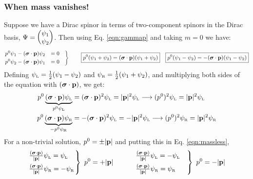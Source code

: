 \subsubsection{When mass vanishes!}
Suppose we have a Dirac spinor in terms of two-component spinors in the Dirac basis, $\Psi = \mqty(\psi_1\\ \psi_2)$. Then using Eq. \ref{eqn:gammap} and taking $m=0$ we have:
\begin{align}\label{eqn:massless}
    \begin{rcases}p^0 \psi_1 - (\boldsymbol{\sigma}\cdot \vb{p})\psi_2 &= 0\quad\\
    p^0 \psi_2 -(\boldsymbol{\sigma}\cdot \vb{p})\psi_1 &= 0\quad \end{rcases}\qquad 
    \boxed{p^0(\psi_1 + \psi_2) = (\boldsymbol{\sigma}\cdot \vb{p})(\psi_1+\psi_2)}\quad
    \boxed{p^0(\psi_1 - \psi_2) = -(\boldsymbol{\sigma}\cdot \vb{p})(\psi_1-\psi_2)}
\end{align}
Defining $\psi_{\text{\tiny L}} = \frac{1}{2}(\psi_1-\psi_2)$ and $\psi_{\text{\tiny R}} =\frac{1}{2} (\psi_1+\psi_2)$, and multiplying both sides of the equation with $(\boldsymbol{\sigma}\cdot \vb{p})$, we get:
\begin{align*}
 p^0\underbrace{(\boldsymbol{\sigma}\cdot \vb{p})\psi_{\text{\tiny L}}}_{p^0 \psi_{\text{\tiny L}}}&= (\boldsymbol{\sigma}\cdot \vb{p})^2\psi_{\text{\tiny L}} = |\vb{p}|^2 \psi_{\text{\tiny L}}\longrightarrow (p^0)^2 \psi_{\text{\tiny L}} = |\vb{p}|^2 \psi_{\text{\tiny L}}\\
 p^0\underbrace{(\boldsymbol{\sigma}\cdot \vb{p})\psi_{\text{\tiny R}}}_{-p^0 \psi_{\text{\tiny R}}} &=- (\boldsymbol{\sigma}\cdot \vb{p})^2\psi_{\text{\tiny L}} = -|\vb{p}|^2 \psi_{\text{\tiny L}}\longrightarrow (p^0)^2 \psi_{\text{\tiny R}} = |\vb{p}|^2 \psi_{\text{\tiny R}}
\end{align*}
For a non-trivial solution, $p^0 = \pm |\vb{p}|$ and putting this in Eq. \ref{eqn:massless}, 
\begin{align}
    \begin{rcases}
    \frac{(\boldsymbol{\sigma}\cdot \vb{p})}{|\vb{p}|} \psi_{\text{\tiny L}} =\psi_{\text{\tiny L}}\quad \\
     \frac{(\boldsymbol{\sigma}\cdot \vb{p})}{|\vb{p}|} \psi_{\text{\tiny R}} =-\psi_{\text{\tiny R}} 
    \end{rcases}\ p^0 = +|\vb{p}| \qquad\quad 
    \begin{rcases}
    \frac{(\boldsymbol{\sigma}\cdot \vb{p})}{|\vb{p}|} \psi_{\text{\tiny L}} = -\psi_{\text{\tiny L}}\quad \\
     \frac{(\boldsymbol{\sigma}\cdot \vb{p})}{|\vb{p}|} \psi_{\text{\tiny R}} =\psi_{\text{\tiny R}} 
    \end{rcases}\ p^0 = -|\vb{p}|
\end{align}
